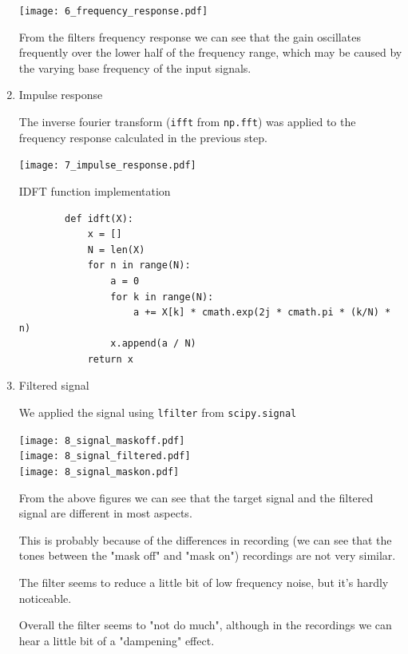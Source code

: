 \documentclass[a4paper, 11pt]{article}
\begin{document}
\begin{enumerate}
        \texttt{[image: 6\_frequency\_response.pdf]}

        From the filters frequency response we can see that the gain oscillates frequently
        over the lower half of the frequency range,
        which may be caused by the varying base frequency of the input signals.

        \item
        Impulse response

        The inverse fourier transform (\texttt{ifft} from \texttt{np.fft})
        was applied to the frequency response calculated in the previous step.

        \texttt{[image: 7\_impulse\_response.pdf]}

        IDFT function implementation

        \begin{verbatim}
        def idft(X):
            x = []
            N = len(X)
            for n in range(N):
                a = 0
                for k in range(N):
                    a += X[k] * cmath.exp(2j * cmath.pi * (k/N) * n)
                x.append(a / N)
            return x
        \end{verbatim}

        \newpage

        \item
        Filtered signal

        We applied the signal using \texttt{lfilter} from \texttt{scipy.signal}

        \texttt{[image: 8\_signal\_maskoff.pdf]} \\
        \texttt{[image: 8\_signal\_filtered.pdf]} \\
        \texttt{[image: 8\_signal\_maskon.pdf]}

        From the above figures we can see that the target signal and the filtered signal are different in most aspects.

        This is probably because of the differences in recording
        (we can see that the tones between the "mask off" and "mask on") recordings are not very similar.

        The filter seems to reduce a little bit of low frequency noise, but it's hardly noticeable.

        Overall the filter seems to "not do much",
        although in the recordings we can hear a little bit of a "dampening" effect.


\end{enumerate}
\end{document}
